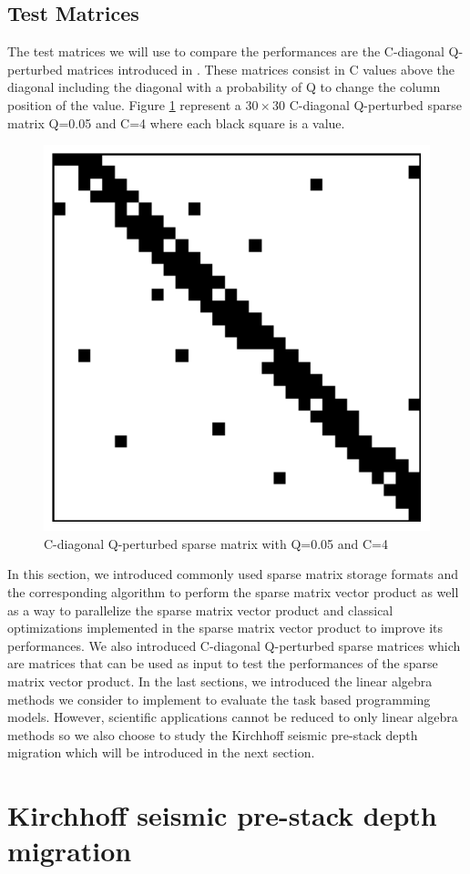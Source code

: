 \subsection{Test Matrices}

The test matrices we will use to compare the performances are the C-diagonal Q-perturbed matrices introduced in \cite{PetiW1992} \cite{HuguP2010}.
These matrices consist in C values above the diagonal including the diagonal with a probability of Q to change the column position of the value.
Figure \ref{fig:cqmat} represent a $30 \times 30$ C-diagonal Q-perturbed sparse matrix Q=0.05 and C=4 where each black square is a value.

\begin{figure}[H]
	\centering
	\includegraphics[width=.5\textwidth]{cqmat}
	\caption{C-diagonal Q-perturbed sparse matrix with Q=0.05 and C=4\label{fig:cqmat}}
\end{figure}

In this section, we introduced commonly used sparse matrix storage formats and the corresponding algorithm to perform the sparse matrix vector product as well as a way to parallelize the sparse matrix vector product and classical optimizations implemented in the sparse matrix vector product to improve its performances.
We also introduced C-diagonal Q-perturbed sparse matrices which are matrices that can be used as input to test the performances of the sparse matrix vector product.
In the last sections, we introduced the linear algebra methods we consider to implement to evaluate the task based programming models.
However, scientific applications cannot be reduced to only linear algebra methods so we also choose to study the Kirchhoff seismic pre-stack depth migration which will be introduced in the next section.

\section{Kirchhoff seismic pre-stack depth migration}

